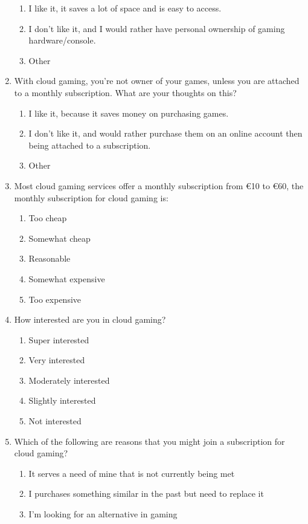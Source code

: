 \begin{enumerate}
	\begin{enumerate}
		\item I like it, it saves a lot of space and is easy to access.
		\item I don't like it, and I would rather have personal ownership of gaming hardware/console.
		\item Other
	\end{enumerate}
	\item With cloud gaming, you're not owner of your games, unless you are attached to a monthly subscription. What are your thoughts on this?
	\begin{enumerate}
		\item I like it, because it saves money on purchasing games.
		\item I don't like it, and would rather purchase them on an online account then being attached to a subscription.
		\item Other
	\end{enumerate}
	\item Most cloud gaming services offer a monthly subscription from €10 to €60, the monthly subscription for cloud gaming is:
	\begin{enumerate}
		\item Too cheap
		\item Somewhat cheap
		\item Reasonable
		\item Somewhat expensive
		\item Too expensive
	\end{enumerate}
	\item How interested are you in cloud gaming?
	\begin{enumerate}
		\item Super interested
		\item Very interested
		\item Moderately interested
		\item Slightly interested
		\item Not interested
	\end{enumerate}
	\item Which of the following are reasons that you might join a subscription for cloud gaming?
	\begin{enumerate}
		\item It serves a need of mine that is not currently being met
		\item I purchases something similar in the past but need to replace it
		\item I'm looking for an alternative in gaming

\end{enumerate}
\end{enumerate}
